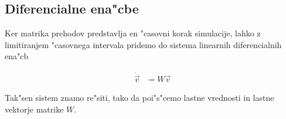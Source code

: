 \documentclass[a4paper,10pt]{article}
\begin{document}
\subsection{Diferencialne ena"cbe}

Ker matrika prehodov predstavlja en "casovni korak simulacije, lahko z limitiranjem "casovnega intervala pridemo do sistema linearnih diferencialnih ena"cb

\begin{align}
  \dot {\vec v} &= W \vec v
\end{align}

Tak"sen sistem znamo re"siti, tako da poi"s"cemo lastne vrednosti in lastne vektorje matrike $W$. 
\end{document}
